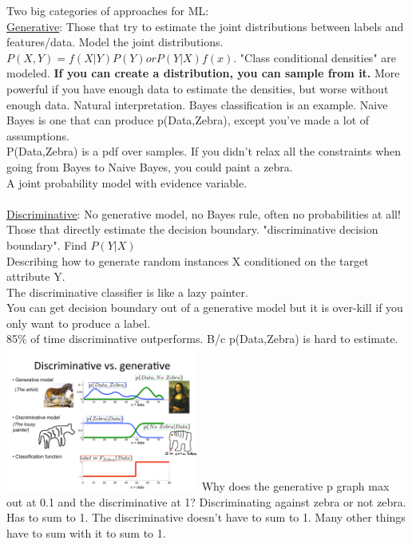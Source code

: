 Two big categories of approaches for ML: \hfill \\
\underline{Generative}:
		Those that try to estimate the joint distributions between labels and features/data. 
		Model the joint distributions. $P(X,Y) = f(X|Y) P(Y) or P(Y|X)f(x)$.  
		"Class conditional densities" are modeled.  %
		\textbf{If you can create a distribution, you can sample from it.}  %
		More powerful if you have enough data to estimate the densities, but worse without enough data.
		Natural interpretation.  
		Bayes classification is an example.    
		Naive Bayes is one that can produce p(Data,Zebra), except you've made a lot of assumptions.   \hfill \\  %
		P(Data,Zebra) is a pdf over samples. 
		If you didn't relax all the constraints when going from Bayes to Naive Bayes, you could paint a zebra.   \hfill \\
		A joint probability model with evidence variable.   \hfill \\  %
 \hfill \\
\underline{Discriminative}:
		No generative model, no Bayes rule, often no probabilities at all!   \hfill \\  %
		Those that directly estimate the decision boundary.  "discriminative decision boundary".  Find $P(Y|X)$ \hfill \\
		Describing how to generate random instances X conditioned on the target attribute Y.  \hfill \\
		The discriminative classifier is like a lazy painter.  \hfill \\  %
		You can get decision boundary out of a generative model but it is over-kill if you only want to produce a label.  \hfill \\  %
		 85\% of time discriminative outperforms.  B/c p(Data,Zebra) is hard to estimate.  \hfill \\  %
		 
		 
\includegraphics[width=2.5in]{figures/zebra_painting.pdf}
Why does the generative p graph max out at 0.1 and the discriminative at 1?   
    Discriminating against zebra or not zebra.  Has to sum to 1.  
    The discriminative doesn't have to sum to 1.  Many other things have to sum with it to sum to 1. 
    
